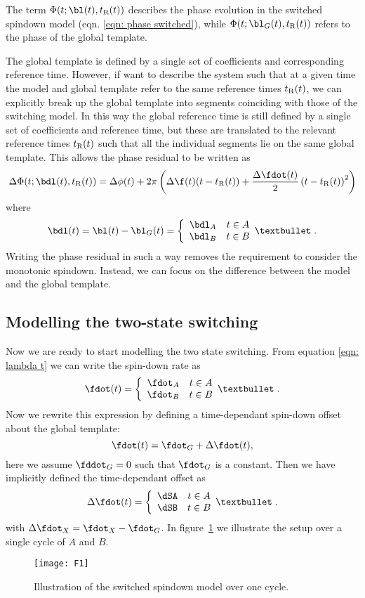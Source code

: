 \documentclass[/home/greg/Thesis/main/main.tex]{subfiles}
\begin{document}
The term $\Phi(t; \bl(t), \tref(t))$ describes the phase evolution in the
switched spindown model (eqn. \eqref{eqn: phase switched}), while $\Phi(t; \bl_{G}(t), \tref(t))$ refers to the
phase of the global template. 

The global template is defined by a single set of
coefficients and corresponding reference time. However, if want to describe the
system such that at a given time
the model and global template refer to the same reference times $t_{\textrm{R}}(t)$, we
can explicitly break up the global template into segments coinciding with
those of the switching model. In this way the global reference time is still
defined by a single set of coefficients and reference time, but these are 
translated to the relevant reference times $t_{\textrm{R}}(t)$ such that all the individual
segments lie on the same global template. This allows the phase residual to be written as
\begin{equation}
\Delta\Phi(t; \bdl(t), \tref(t)) = \Delta\phi(t) + 2\pi\left( \Delta\f(t)(t-\tref(t)) + \frac{\Delta\fdot(t)}{2}\left(t-\tref(t)\right)^{2}\right)
\label{eqn: general phase residual}
\end{equation}
where  
\begin{equation}
\bdl(t) = \bl(t) - \bl_{G}(t) = \left\{
\begin{array}{cc}
\bdl_{A} & t \in A \\
\bdl_{B} & t \in B
\end{array}•
\right. .
\end{equation}
Writing the phase residual in such a way removes the requirement to consider
the monotonic spindown. Instead, we can focus on the difference between the
model and the global template.  

\subsection{Modelling the two-state switching}
Now we are ready to start modelling the two state switching. From equation 
\eqref{eqn: lambda t} we can write the spin-down rate as
\begin{equation}
\fdot(t) = \two{\fdot_{A}}{\fdot_{B}}.
\end{equation}
Now we rewrite this expression by defining a time-dependant spin-down offset
about the global template:
\begin{equation}
\fdot(t) = \fdot_{G} + \Delta\fdot(t),
\end{equation}
here we assume $\fddot_{G}=0$ such that $\fdot_{G}$ is a constant. Then we have
implicitly defined the time-dependant offset as
\begin{equation}
\Delta \fdot(t) = \two{\dSA}{\dSB} .
\end{equation}
with $\Delta \fdot_{X} = \fdot_{X} - \fdot_{G}$. In figure~\ref{fig: F1} we 
illustrate the setup over a single cycle of $A$ and $B$.
\begin{figure}[htb]
\centering
\texttt{[image: F1]}
\caption{Illustration of the switched spindown model over one cycle.}
\label{fig: F1}
\end{figure}
\end{document}
